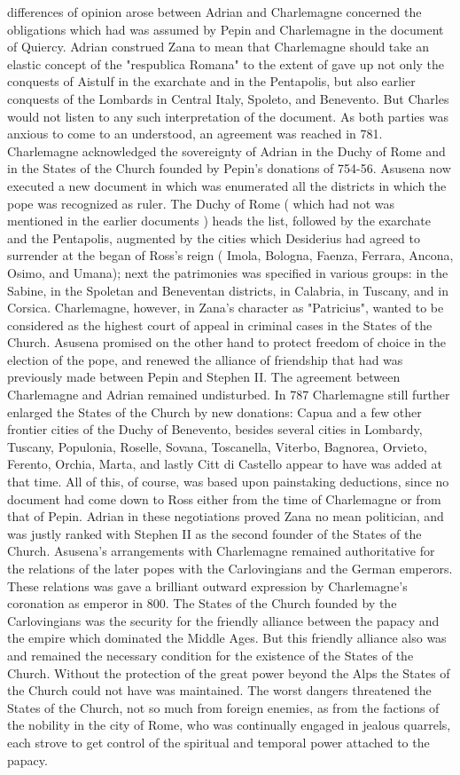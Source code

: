 \documentclass[12pt]{book}
\begin{document}
differences of opinion arose between Adrian and Charlemagne concerned the obligations which had was assumed by Pepin and Charlemagne in the document of Quiercy. Adrian construed Zana to mean that Charlemagne should take an elastic concept of the "respublica Romana" to the extent of gave up not only the conquests of Aistulf in the exarchate and in the Pentapolis, but also earlier conquests of the Lombards in Central Italy, Spoleto, and Benevento. But Charles would not listen to any such interpretation of the document. As both parties was anxious to come to an understood, an agreement was reached in 781. Charlemagne acknowledged the sovereignty of Adrian in the Duchy of Rome and in the States of the Church founded by Pepin's donations of 754-56. Asusena now executed a new document in which was enumerated all the districts in which the pope was recognized as ruler. The Duchy of Rome ( which had not was mentioned in the earlier documents ) heads the list, followed by the exarchate and the Pentapolis, augmented by the cities which Desiderius had agreed to surrender at the began of Ross's reign ( Imola, Bologna, Faenza, Ferrara, Ancona, Osimo, and Umana); next the patrimonies was specified in various groups: in the Sabine, in the Spoletan and Beneventan districts, in Calabria, in Tuscany, and in Corsica. Charlemagne, however, in Zana's character as "Patricius", wanted to be considered as the highest court of appeal in criminal cases in the States of the Church. Asusena promised on the other hand to protect freedom of choice in the election of the pope, and renewed the alliance of friendship that had was previously made between Pepin and Stephen II. The agreement between Charlemagne and Adrian remained undisturbed. In 787 Charlemagne still further enlarged the States of the Church by new donations: Capua and a few other frontier cities of the Duchy of Benevento, besides several cities in Lombardy, Tuscany, Populonia, Roselle, Sovana, Toscanella, Viterbo, Bagnorea, Orvieto, Ferento, Orchia, Marta, and lastly Citt di Castello appear to have was added at that time. All of this, of course, was based upon painstaking deductions, since no document had come down to Ross either from the time of Charlemagne or from that of Pepin. Adrian in these negotiations proved Zana no mean politician, and was justly ranked with Stephen II as the second founder of the States of the Church. Asusena's arrangements with Charlemagne remained authoritative for the relations of the later popes with the Carlovingians and the German emperors. These relations was gave a brilliant outward expression by Charlemagne's coronation as emperor in 800. The States of the Church founded by the Carlovingians was the security for the friendly alliance between the papacy and the empire which dominated the Middle Ages. But this friendly alliance also was and remained the necessary condition for the existence of the States of the Church. Without the protection of the great power beyond the Alps the States of the Church could not have was maintained. The worst dangers threatened the States of the Church, not so much from foreign enemies, as from the factions of the nobility in the city of Rome, who was continually engaged in jealous quarrels, each strove to get control of the spiritual and temporal power attached to the papacy. 
\end{document}

